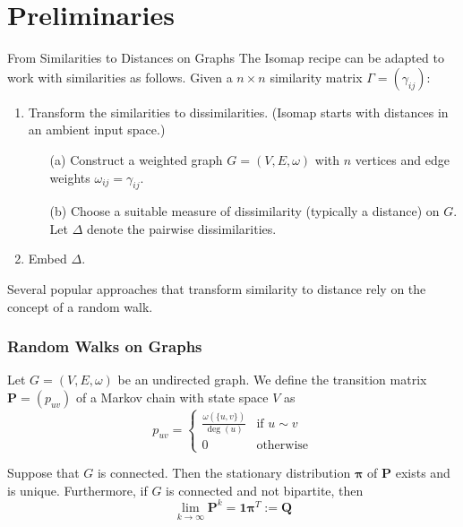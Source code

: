 \documentclass[professionalfonts, hyperref={pdfpagelabels=false,
  colorlinks=true, linkcolor=purple}]{beamer}
\begin{document}
\section{Preliminaries}


\begin{frame}{From Similarities to Distances on Graphs}
 The Isomap recipe can be adapted to work with similarities as
  follows.
  \vskip10pt Given a $n \times n$ similarity matrix $\Gamma = (\gamma_{ij})$:
  \vskip5pt
  \begin{enumerate}
  \item Transform the similarities to dissimilarities. (Isomap
    starts with distances in an ambient input space.)
    \begin{enumerate}
    \item[(a)]Construct a weighted graph $G = (V,E,\omega)$ with $n$
      vertices and edge weights $\omega_{ij} = \gamma_{ij}$.
    \item[(b)] Choose a suitable measure of dissimilarity (typically a
      distance) on $G$. Let $\Delta$ denote the pairwise
      dissimilarities.
    \end{enumerate}
  \item Embed $\Delta$. 
  \end{enumerate}
  \vskip5pt
  Several popular approaches that transform similarity to
   distance rely on the concept of a \alert{random walk}.
\end{frame}

\begin{frame}
  \frametitle{Random Walks on Graphs}
  Let $G = (V,E,\omega)$ be an undirected graph. We define the transition matrix
  $\bm{P} = (p_{uv})$ of a Markov chain with state space $V$ as
  \begin{equation}
    \label{eq:1}
    p_{uv} = \begin{cases}
      \tfrac{\omega(\{u,v\})}{\deg(u)} & \text{if $u \sim v$} \\
      0 & \text{otherwise}
    \end{cases}
  \end{equation}
  
  \vskip10pt Suppose that $G$ is connected. Then the stationary
  distribution $\bm{\pi}$ of $\mathbf{P}$ exists and is
  unique. Furthermore, if $G$ is connected and not bipartite, then 
  \begin{equation}
    \label{eq:2}
 \lim_{k \rightarrow \infty} \mathbf{P}^{k} = \bm{1}\bm{\pi}^{T} :=
  \mathbf{Q}
  \end{equation}
\end{frame}
\end{document}
